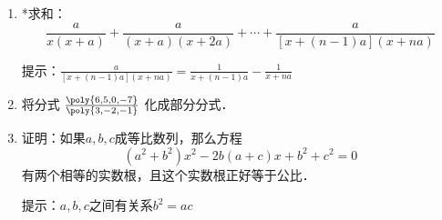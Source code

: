 \begin{enumerate}
\item *求和：
\[\frac{a}{x(x+a)}+\frac{a}{(x+a)(x+2a)}+\cdots +\frac{a}{[x+(n-1)a](x+na)}\]

提示：$\frac{a}{[x+(n-1)a](x+na)}=\frac{1}{x+(n-1)a}-\frac{1}{x+na}$

\item 将分式 $\frac{\poly{6,5,0,-7}}{\poly{3,-2,-1}}$ 化成部分分式．

\item 证明：如果$a,b,c$成等比数列，那么方程
\[(a^2+b^2)x^2-2b(a+c)x+b^2+c^2=0\]
有两个相等的实数根，且这个实数根正好等于公比．

提示：$a,b,c$之间有关系$b^2=ac$

\end{enumerate}